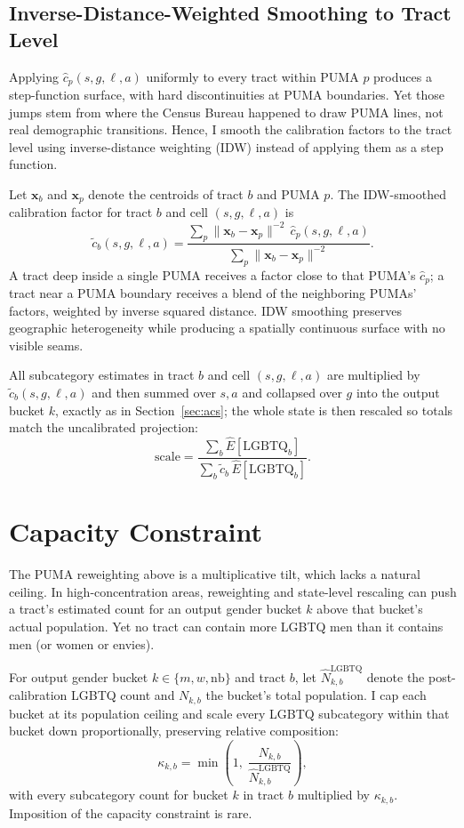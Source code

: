 \documentclass[11pt]{article}
\begin{document}
\subsection{Inverse-Distance-Weighted Smoothing to Tract Level}

Applying $\hat c_p(s,g,\ell,a)$ uniformly to every tract within PUMA $p$
produces a step-function surface, with hard discontinuities at PUMA
boundaries. Yet those jumps stem from where the Census Bureau happened to
draw PUMA lines, not real demographic transitions. Hence, I smooth the
calibration factors to the tract level using inverse-distance weighting
(IDW) instead of applying them as a step function.

Let $\mathbf{x}_b$ and $\mathbf{x}_p$ denote the centroids of tract $b$ and
PUMA $p$. The IDW-smoothed calibration factor for tract $b$ and cell
$(s,g,\ell,a)$ is
\[
\tilde{c}_b(s,g,\ell,a)
=
\frac{\displaystyle\sum_p \|\mathbf{x}_b - \mathbf{x}_p\|^{-2}\,
\hat{c}_p(s,g,\ell,a)}
     {\displaystyle\sum_p \|\mathbf{x}_b - \mathbf{x}_p\|^{-2}}.
\]
A tract deep inside a single PUMA receives a factor close to that PUMA's $\hat{c}_p$; a tract near a PUMA boundary receives a blend of the neighboring PUMAs' factors, weighted by inverse squared distance. IDW smoothing preserves geographic heterogeneity while producing a spatially continuous surface with no visible seams.

All subcategory estimates in tract $b$ and cell $(s,g,\ell,a)$ are
multiplied by $\tilde c_b(s,g,\ell,a)$ and then summed over $s,a$ and
collapsed over $g$ into the output bucket $k$, exactly as in
Section~\ref{sec:acs}; the whole state is then rescaled so totals match the
uncalibrated projection:
\[
\text{scale} =
\frac{\sum_b \hat{E}[\text{LGBTQ}_b]}{\sum_b \tilde c_b\, \hat{E}[\text{LGBTQ}_b]}.
\]

\section{Capacity Constraint}
\label{sec:capacity}

The PUMA reweighting above is a multiplicative tilt, which lacks a natural ceiling. In high-concentration areas, reweighting and state-level rescaling can push a tract's estimated count for an output gender bucket $k$ above that bucket's actual population. Yet no tract can contain more LGBTQ men than it contains men (or women or envies).

For output gender bucket $k \in \{m, w, \text{nb}\}$ and tract $b$, let
$\hat N^{\text{LGBTQ}}_{k,b}$ denote the post-calibration LGBTQ count and
$N_{k,b}$ the bucket's total population. I cap each bucket at its
population ceiling and scale every LGBTQ subcategory within that bucket down
proportionally, preserving relative composition:
\[
\kappa_{k,b} = \min\!\left(1,\; \frac{N_{k,b}}{\hat N^{\text{LGBTQ}}_{k,b}}
\right),
\]
with every subcategory count for bucket $k$ in tract $b$ multiplied by
$\kappa_{k,b}$. Imposition of the capacity constraint is rare. 
\end{document}
